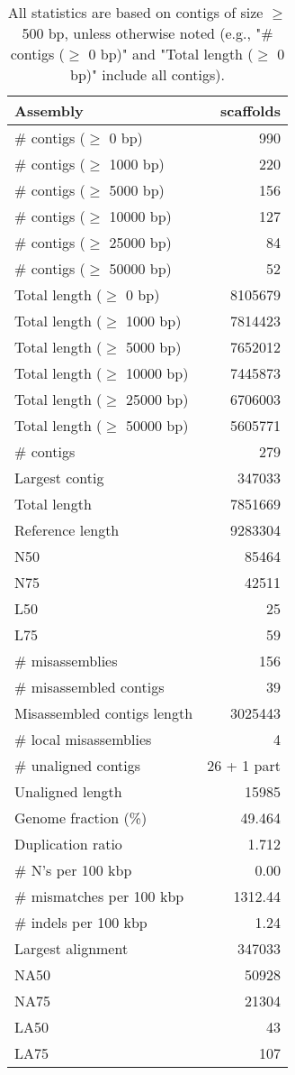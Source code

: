 \documentclass[12pt,a4paper]{article}
\begin{document}
\begin{table}[ht]
\begin{center}
\caption{All statistics are based on contigs of size $\geq$ 500 bp, unless otherwise noted (e.g., "\# contigs ($\geq$ 0 bp)" and "Total length ($\geq$ 0 bp)" include all contigs).}
\begin{tabular}{|l*{1}{|r}|}
\hline
Assembly & scaffolds \\ \hline
\# contigs ($\geq$ 0 bp) & 990 \\ \hline
\# contigs ($\geq$ 1000 bp) & 220 \\ \hline
\# contigs ($\geq$ 5000 bp) & 156 \\ \hline
\# contigs ($\geq$ 10000 bp) & 127 \\ \hline
\# contigs ($\geq$ 25000 bp) & 84 \\ \hline
\# contigs ($\geq$ 50000 bp) & 52 \\ \hline
Total length ($\geq$ 0 bp) & 8105679 \\ \hline
Total length ($\geq$ 1000 bp) & 7814423 \\ \hline
Total length ($\geq$ 5000 bp) & 7652012 \\ \hline
Total length ($\geq$ 10000 bp) & 7445873 \\ \hline
Total length ($\geq$ 25000 bp) & 6706003 \\ \hline
Total length ($\geq$ 50000 bp) & 5605771 \\ \hline
\# contigs & 279 \\ \hline
Largest contig & 347033 \\ \hline
Total length & 7851669 \\ \hline
Reference length & 9283304 \\ \hline
N50 & 85464 \\ \hline
N75 & 42511 \\ \hline
L50 & 25 \\ \hline
L75 & 59 \\ \hline
\# misassemblies & 156 \\ \hline
\# misassembled contigs & 39 \\ \hline
Misassembled contigs length & 3025443 \\ \hline
\# local misassemblies & 4 \\ \hline
\# unaligned contigs & 26 + 1 part \\ \hline
Unaligned length & 15985 \\ \hline
Genome fraction (\%) & 49.464 \\ \hline
Duplication ratio & 1.712 \\ \hline
\# N's per 100 kbp & 0.00 \\ \hline
\# mismatches per 100 kbp & 1312.44 \\ \hline
\# indels per 100 kbp & 1.24 \\ \hline
Largest alignment & 347033 \\ \hline
NA50 & 50928 \\ \hline
NA75 & 21304 \\ \hline
LA50 & 43 \\ \hline
LA75 & 107 \\ \hline
\end{tabular}
\end{center}
\end{table}
\end{document}
